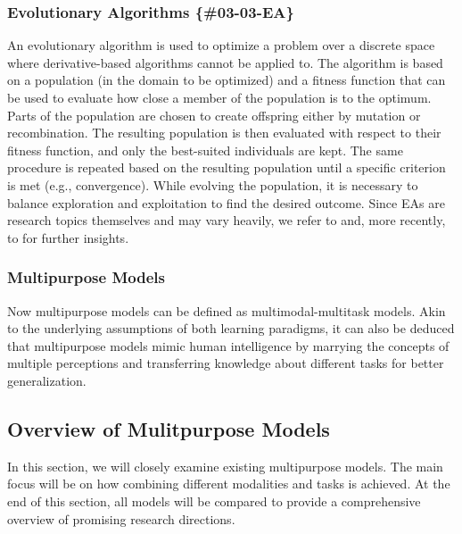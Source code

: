\documentclass[
]{krantz}
\begin{document}
\hypertarget{evolutionary-algorithms-03-03-ea}{%
\subsubsection{Evolutionary Algorithms \{\#03-03-EA\}}\label{evolutionary-algorithms-03-03-ea}}

An evolutionary algorithm is used to optimize a problem over a discrete space where derivative-based algorithms cannot be applied to. The algorithm is based on a population
(in the domain to be optimized) and a fitness function that can be used to evaluate how close a member of the population is to the optimum. Parts of the population are chosen
to create offspring either by mutation or recombination. The resulting population is then evaluated with respect to their fitness function, and only the best-suited individuals are kept.
The same procedure is repeated based on the resulting population until a specific criterion is met (e.g., convergence). While evolving the population, it is necessary to balance exploration
and exploitation to find the desired outcome. Since EAs are research topics themselves and may vary heavily, we refer to \citep{Baeck1993} and, more recently, to \citep{Doerr2021} for further insights.

\hypertarget{multipurpose-models}{%
\subsubsection{Multipurpose Models}\label{multipurpose-models}}

Now multipurpose models can be defined as multimodal-multitask models. Akin to the underlying assumptions of both learning paradigms, it can also be deduced
that multipurpose models mimic human intelligence by marrying the concepts of multiple perceptions and transferring knowledge about different tasks for better generalization.

\hypertarget{overview-of-mulitpurpose-models}{%
\subsection{Overview of Mulitpurpose Models}\label{overview-of-mulitpurpose-models}}

In this section, we will closely examine existing multipurpose models. The main focus will be on how combining different modalities and tasks is achieved. At the end of
this section, all models will be compared to provide a comprehensive overview of promising research directions.
\end{document}
